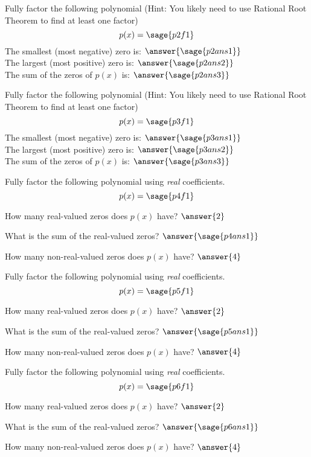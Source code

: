 \documentclass{ximera}
\begin{document}
\begin{problem}%
    Fully factor the following polynomial (Hint: You likely need to use Rational Root Theorem to find at least one factor)
    \[
        p(x) = \sage{p2f1}
    \]
    The smallest (most negative) zero is: $\answer{\sage{p2ans1}}$\\
    The largest (most positive) zero is: $\answer{\sage{p2ans2}}$\\
    The sum of the zeros of $p(x)$ is: $\answer{\sage{p2ans3}}$
\end{problem}


\begin{problem}%
    Fully factor the following polynomial (Hint: You likely need to use Rational Root Theorem to find at least one factor)
    \[
        p(x) = \sage{p3f1}
    \]
    The smallest (most negative) zero is: $\answer{\sage{p3ans1}}$\\
    The largest (most positive) zero is: $\answer{\sage{p3ans2}}$\\
    The sum of the zeros of $p(x)$ is: $\answer{\sage{p3ans3}}$
\end{problem}


\begin{problem}%
    Fully factor the following polynomial using \textit{real} coefficients.
    \[
        p(x) = \sage{p4f1}
    \]
    
    How many real-valued zeros does $p(x)$ have? $\answer{2}$
    
    What is the sum of the real-valued zeros? $\answer{\sage{p4ans1}}$
    
    How many non-real-valued zeros does $p(x)$ have? $\answer{4}$
\end{problem}

\begin{problem}%
    Fully factor the following polynomial using \textit{real} coefficients.
    \[
        p(x) = \sage{p5f1}
    \]
    
    How many real-valued zeros does $p(x)$ have? $\answer{2}$
    
    What is the sum of the real-valued zeros? $\answer{\sage{p5ans1}}$
    
    How many non-real-valued zeros does $p(x)$ have? $\answer{4}$
\end{problem}

\begin{problem}%
    Fully factor the following polynomial using \textit{real} coefficients.
    \[
        p(x) = \sage{p6f1}
    \]
    
    How many real-valued zeros does $p(x)$ have? $\answer{2}$
    
    What is the sum of the real-valued zeros? $\answer{\sage{p6ans1}}$
    
    How many non-real-valued zeros does $p(x)$ have? $\answer{4}$
\end{problem}
\end{document}
